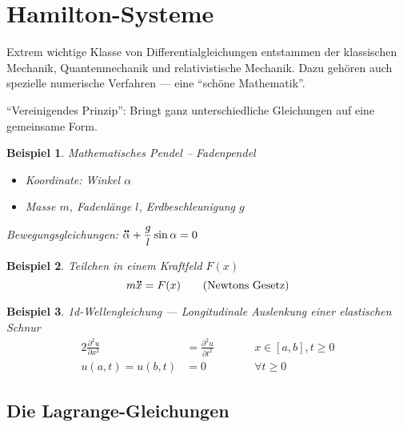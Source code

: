 \documentclass[german]{scrreprt}
\theoremstyle{plain}
\theoremstyle{nonumberplain}
\theoremstyle{nonumberplain}
\newtheorem{bsp}{Beispiel}
\theoremstyle{nonumberplain}
\renewcommand*{\ddot}[1]{\accentset{\mbox{\large\bfseries .\hspace{-0.25ex}.}}{#1}}
\begin{document}

\renewcommand*\contentsname{\huge \centering Optimierung \& Numerik --- Vorlesung 12}
\tableofcontents


\setcounter{chapter}{12}
\setcounter{section}{0}
\setcounter{satz}{0}
\setcounter{lemma}{0}
\setcounter{equation}{0}


\section{Hamilton-Systeme}

Extrem wichtige Klasse von Differentialgleichungen entstammen der klassischen Mechanik, Quantenmechanik und relativistische Mechanik. Dazu gehören auch spezielle numerische Verfahren --- eine \enquote{schöne Mathematik}.

\enquote{Vereinigendes Prinzip}: Bringt ganz unterschiedliche Gleichungen auf eine gemeinsame Form.


\begin{bsp}
	Mathematisches Pendel -- Fadenpendel
	\begin{itemize}
		\item Koordinate: Winkel $\alpha$
		\item Masse $m$, Fadenlänge $l$, Erdbeschleunigung $g$
	\end{itemize}
	Bewegungsgleichungen: $\displaystyle \ddot \alpha + \frac{g}{l} \sin \alpha = 0$
\end{bsp}

\begin{bsp}
	Teilchen in einem Kraftfeld $F(x)$
	\begin{equation}
		m \ddot x = F(x) \tag{Newtons Gesetz}
	\end{equation}
\end{bsp}

\begin{bsp}
	1d-Wellengleichung --- Longitudinale Auslenkung einer elastischen Schnur
	\begin{alignat*}{2}
		\frac{\partial^2 u}{\partial x^2} & = \frac{\partial^2 u}{\partial t^2} & \qquad & x \in [a, b], t \ge 0 \\
		u(a, t) = u(b, t) & = 0 && \forall t \ge 0
	\end{alignat*}
\end{bsp}


\subsection{Die Lagrange-Gleichungen}
\label{sec:lagrange_gleichung}
\end{document}
